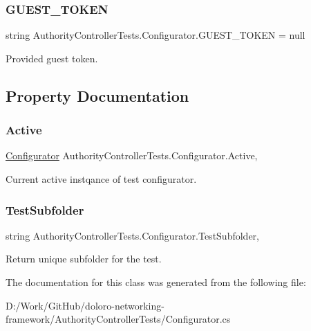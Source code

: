 \subsubsection{\texorpdfstring{G\+U\+E\+S\+T\+\_\+\+T\+O\+K\+EN}{GUEST\_TOKEN}}
{\footnotesize\ttfamily string Authority\+Controller\+Tests.\+Configurator.\+G\+U\+E\+S\+T\+\_\+\+T\+O\+K\+EN = null\hspace{0.3cm}{\ttfamily [static]}}



Provided guest token. 



\subsection{Property Documentation}
\mbox{\label{class_authority_controller_tests_1_1_configurator_ab9ca617d4f63c060c5446b24628f2774}} 
\subsubsection{\texorpdfstring{Active}{Active}}
{\footnotesize\ttfamily \mbox{\hyperlink{class_authority_controller_tests_1_1_configurator}{Configurator}} Authority\+Controller\+Tests.\+Configurator.\+Active\hspace{0.3cm}{\ttfamily [static]}, {\ttfamily [get]}}



Current active instqance of test configurator. 

\mbox{\label{class_authority_controller_tests_1_1_configurator_a5f07aec045009437243f33e3cabc2fdd}} 
\subsubsection{\texorpdfstring{Test\+Subfolder}{TestSubfolder}}
{\footnotesize\ttfamily string Authority\+Controller\+Tests.\+Configurator.\+Test\+Subfolder\hspace{0.3cm}{\ttfamily [static]}, {\ttfamily [get]}}



Return unique subfolder for the test. 



The documentation for this class was generated from the following file\+:\begin{DoxyCompactItemize}
\item 
D\+:/\+Work/\+Git\+Hub/doloro-\/networking-\/framework/\+Authority\+Controller\+Tests/Configurator.\+cs\end{DoxyCompactItemize}
